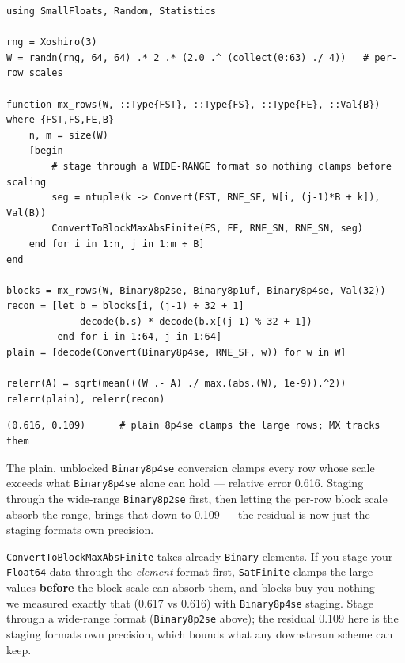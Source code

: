 \nopagebreak[4]
\begin{minipage}{\linewidth}
\begin{verbatim}
using SmallFloats, Random, Statistics

rng = Xoshiro(3)
W = randn(rng, 64, 64) .* 2 .* (2.0 .^ (collect(0:63) ./ 4))   # per-row scales

function mx_rows(W, ::Type{FST}, ::Type{FS}, ::Type{FE}, ::Val{B}) where {FST,FS,FE,B}
    n, m = size(W)
    [begin
        # stage through a WIDE-RANGE format so nothing clamps before scaling
        seg = ntuple(k -> Convert(FST, RNE_SF, W[i, (j-1)*B + k]), Val(B))
        ConvertToBlockMaxAbsFinite(FS, FE, RNE_SN, RNE_SN, seg)
    end for i in 1:n, j in 1:m ÷ B]
end

blocks = mx_rows(W, Binary8p2se, Binary8p1uf, Binary8p4se, Val(32))
recon = [let b = blocks[i, (j-1) ÷ 32 + 1]
             decode(b.s) * decode(b.x[(j-1) % 32 + 1])
         end for i in 1:64, j in 1:64]
plain = [decode(Convert(Binary8p4se, RNE_SF, w)) for w in W]

relerr(A) = sqrt(mean(((W .- A) ./ max.(abs.(W), 1e-9)).^2))
relerr(plain), relerr(recon)
\end{verbatim}




\begin{verbatim}
(0.616, 0.109)      # plain 8p4se clamps the large rows; MX tracks them
\end{verbatim}
\end{minipage}




The plain, unblocked \texttt{Binary8p4se} conversion clamps every row whose scale exceeds what \texttt{Binary8p4se} alone can hold — relative error 0.616. Staging through the wide-range \texttt{Binary8p2se} first, then letting the per-row block scale absorb the range, brings that down to 0.109 — the residual is now just the staging format{\textquotesingle}s own precision.



\begin{tcolorbox}[toptitle=-1mm,bottomtitle=1mm,colback=admonition-warning!50!white,colframe=admonition-warning,title=\textbf{Stage wide, then block-quantize}]
\texttt{ConvertToBlockMaxAbsFinite} takes already-\texttt{Binary} elements. If you stage your \texttt{Float64} data through the \emph{element} format first, \texttt{SatFinite} clamps the large values \textbf{before} the block scale can absorb them, and blocks buy you nothing — we measured exactly that (0.617 vs 0.616) with \texttt{Binary8p4se} staging. Stage through a wide-range format (\texttt{Binary8p2se} above); the residual 0.109 here is the staging format{\textquotesingle}s own precision, which bounds what any downstream scheme can keep.

\end{tcolorbox}


